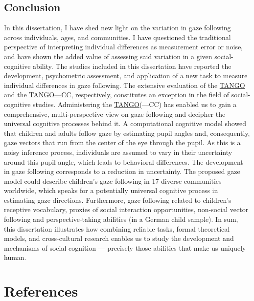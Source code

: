 \documentclass[
]{scrbook}
\begin{document}
\newpage

\section{Conclusion}\label{conclusion}

In this dissertation, I have shed new light on the variation in gaze following across individuals, ages, and communities. I have questioned the traditional perspective of interpreting individual differences as measurement error or noise, and have shown the added value of assessing said variation in a given social-cognitive ability. The studies included in this dissertation have reported the development, psychometric assessment, and application of a new task to measure individual differences in gaze following. The extensive evaluation of the \hyperref[acronyms_TANGO]{TANGO} and the \hyperref[acronyms_TANGOux2014CC]{TANGO---CC}, respectively, constitutes an exception in the field of social-cognitive studies. Administering the \hyperref[acronyms_TANGO]{TANGO}(---CC) has enabled us to gain a comprehensive, multi-perspective view on gaze following and decipher the universal cognitive processes behind it. A computational cognitive model showed that children and adults follow gaze by estimating pupil angles and, consequently, gaze vectors that run from the center of the eye through the pupil. As this is a noisy inference process, individuals are assumed to vary in their uncertainty around this pupil angle, which leads to behavioral differences. The development in gaze following corresponds to a reduction in uncertainty. The proposed gaze model could describe children's gaze following in 17 diverse communities worldwide, which speaks for a potentially universal cognitive process in estimating gaze directions. Furthermore, gaze following related to children's receptive vocabulary, proxies of social interaction opportunities, non-social vector following and perspective-taking abilities (in a German child sample). In sum, this dissertation illustrates how combining reliable tasks, formal theoretical models, and cross-cultural research enables us to study the development and mechanisms of social cognition --- precisely those abilities that make us uniquely human.

\backmatter

\chapter{References}\label{references}
\end{document}
